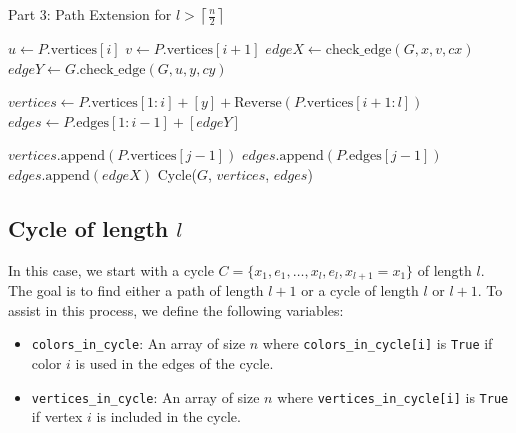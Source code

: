 \begin{algorithm}[H]
    \caption{Part 3: Path Extension for \( l > \left \lceil \frac{n}{2} \right \rceil \)}
    \begin{algorithmic}[1]
                \State $u \gets P.\text{vertices}[i]$
                \State $v \gets P.\text{vertices}[i + 1]$
                \State $edgeX \gets \text{check\_edge}(G, x, v, cx)$
                \State $edgeY \gets G.\text{check\_edge}(G, u, y, cy)$

                    \State $vertices \gets P.\text{vertices}[1:i] + [y] + \text{Reverse}(P.\text{vertices}[i + 1:l])$
                    \State $edges \gets P.\text{edges}[1:i - 1] + [edgeY]$

                        \State $vertices.\text{append}(P.\text{vertices}[j - 1])$
                        \State $edges.\text{append}(P.\text{edges}[j - 1])$
                    \EndFor
                    \State $edges.\text{append}(edgeX)$ 
                    \State \Return Cycle($G$, $vertices$, $edges$)
                \EndIf
            \EndFor
            \State \Return {} 
        \EndFunction
    \end{algorithmic}
\end{algorithm}


\subsection{Cycle of length $l$}

In this case, we start with a cycle \( C = \{x_1, e_1, \dots, x_{l}, e_{l}, x_{l+1} = x_{1}\} \) of length \( l \). 
The goal is to find either a path of length \( l+1 \) or a cycle of length \( l \) or \( l+1 \). 
To assist in this process, we define the following variables:

\begin{itemize}
    \item \texttt{colors\_in\_cycle}: An array of size \( n \) where \texttt{colors\_in\_cycle[i]} is \texttt{True} if color \( i \) is used in the edges of the cycle.
    \item \texttt{vertices\_in\_cycle}: An array of size \( n \) where \texttt{vertices\_in\_cycle[i]} is \texttt{True} if vertex \( i \) is included in the cycle.
\end{itemize}

